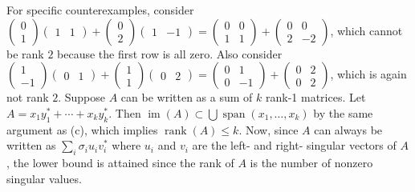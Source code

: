 \documentclass{article}
\newcommand{\openm}{\begin{pmatrix}}
\newcommand{\closem}{\end{pmatrix}}
\DeclareMathOperator{\rank}{rank}
\DeclareMathOperator{\im}{im}
\DeclareMathOperator{\Span}{span}
\begin{document}
For specific counterexamples, consider $\openm0\\1\closem\openm1&1\closem+\openm0\\2\closem\openm1&-1\closem=\openm0&0\\1&1\closem+\openm0&0\\2&-2\closem$, which cannot be rank $2$ because the first row is all zero. Also consider $\openm1\\-1\closem\openm0&1\closem+\openm1\\1\closem\openm0&2\closem=\openm0&1\\0&-1\closem+\openm0&2\\0&2\closem$, which is again not rank $2$.
Suppose $A$ can be written as a sum of $k$ rank-1 matrices. Let $A=x_1y_1^*+\cdots+x_ky_k^*$. Then $\im(A)\subset\bigcup\Span(x_1,\ldots,x_k)$ by the same argument as (c), which implies $\rank(A)\leq k$. Now, since $A$ can always be written as $\sum_i\sigma_iu_iv_i^*$ where $u_i$ and $v_i$ are the left- and right- singular vectors of $A$, the lower bound is attained since the rank of $A$ is the number of nonzero singular values.
\end{document}
